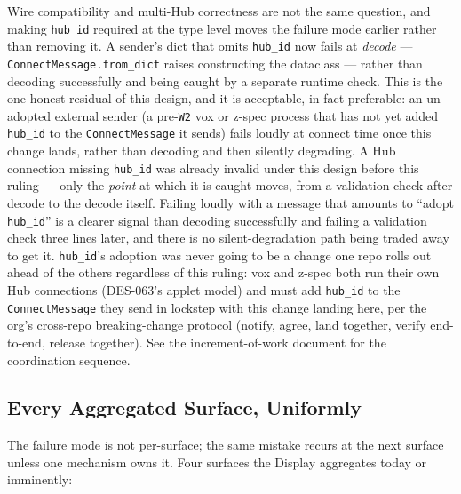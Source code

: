 \documentclass[a4paper,10pt]{article}
\newcommand{\msg}[1]{\texttt{#1}}
\newcommand{\field}[1]{\texttt{#1}}
\begin{document}
Wire compatibility and multi-Hub correctness are not the same question,
and making \field{hub\_id} required at the type level moves the failure
mode earlier rather than removing it.  A sender's dict that omits
\field{hub\_id} now fails at \emph{decode} ---
\msg{ConnectMessage.from\_dict} raises constructing the dataclass ---
rather than decoding successfully and being caught by a separate runtime
check.  This is the one honest residual of this design, and it is
acceptable, in fact preferable: an un-adopted external sender (a
pre-\texttt{W2} vox or z-spec process that has not yet added \field{hub\_id}
to the \msg{ConnectMessage} it sends) fails loudly at connect time once
this change lands, rather than decoding and then silently degrading.  A
Hub connection missing \field{hub\_id} was already invalid under this
design before this ruling --- only the \emph{point} at which it is caught
moves, from a validation check after decode to the decode itself.  Failing
loudly with a message that amounts to ``adopt \field{hub\_id}'' is a
clearer signal than decoding successfully and failing a validation check
three lines later, and there is no silent-degradation path being traded
away to get it.  \field{hub\_id}'s adoption was never going to be a change
one repo rolls out ahead of the others regardless of this ruling: vox and
z-spec both run their own Hub connections (DES-063's applet model) and
must add \field{hub\_id} to the \msg{ConnectMessage} they send in lockstep
with this change landing here, per the org's cross-repo breaking-change
protocol (notify, agree, land together, verify end-to-end, release
together).  See the increment-of-work document for the coordination
sequence.

\subsection{Every Aggregated Surface, Uniformly}

The failure mode is not per-surface; the same mistake recurs at the next
surface unless one mechanism owns it.  Four surfaces the Display aggregates
today or imminently:
\end{document}
